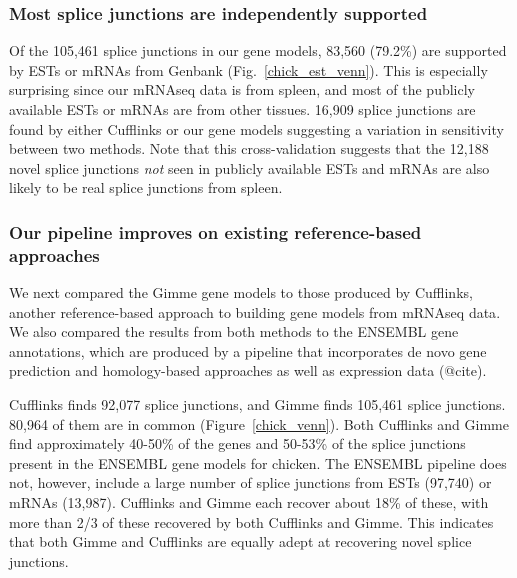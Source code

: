 \documentclass[10pt]{article}
\begin{document}
\subsubsection*{Most splice junctions are independently supported}

Of the 105,461 splice junctions in our gene models, 83,560 (79.2\%) are
supported by ESTs or mRNAs from Genbank (Fig.~\ref{chick_est_venn}).  This is
especially surprising since our mRNAseq data is from spleen, and most of the
publicly available ESTs or mRNAs are from other tissues. 16,909 splice junctions
are found by either Cufflinks or our gene models suggesting a variation in
sensitivity between two methods. Note that this cross-validation suggests that
the 12,188 novel splice junctions {\em not} seen in publicly available ESTs and
mRNAs are also likely to be real splice junctions from spleen.


\subsubsection*{Our pipeline improves on existing reference-based approaches}

We next compared the Gimme gene models to those produced by Cufflinks,
another reference-based approach to building gene models from mRNAseq
data\cite{Trapnell:2010kd}.  We also compared the results from both
methods to the ENSEMBL gene annotations, which are produced by a
pipeline that incorporates de novo gene prediction and homology-based
approaches as well as expression data (@cite).

Cufflinks finds 92,077 splice junctions, and Gimme finds 105,461 splice
junctions.  80,964 of them are in common (Figure~\ref{chick_venn}). Both
Cufflinks and Gimme find approximately 40-50\% of the genes and 50-53\% of the
splice junctions present in the ENSEMBL gene models for chicken.  The ENSEMBL
pipeline does not, however, include a large number of splice junctions from ESTs
(97,740) or mRNAs (13,987).  Cufflinks and Gimme each recover about 18\% of
these, with more than 2/3 of these recovered by both Cufflinks and Gimme.  This
indicates that both Gimme and Cufflinks are equally adept at recovering novel
splice junctions.

\end{document}
